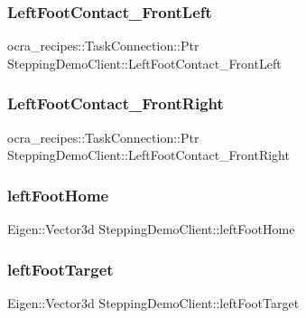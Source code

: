 \subsubsection{\texorpdfstring{Left\+Foot\+Contact\+\_\+\+Front\+Left}{LeftFootContact\_FrontLeft}}
{\footnotesize\ttfamily ocra\+\_\+recipes\+::\+Task\+Connection\+::\+Ptr Stepping\+Demo\+Client\+::\+Left\+Foot\+Contact\+\_\+\+Front\+Left\hspace{0.3cm}{\ttfamily [private]}}

\hypertarget{classSteppingDemoClient_ae2c0ca1ba0ef69b5f09fd3cd982fb772}{}\label{classSteppingDemoClient_ae2c0ca1ba0ef69b5f09fd3cd982fb772} 
\subsubsection{\texorpdfstring{Left\+Foot\+Contact\+\_\+\+Front\+Right}{LeftFootContact\_FrontRight}}
{\footnotesize\ttfamily ocra\+\_\+recipes\+::\+Task\+Connection\+::\+Ptr Stepping\+Demo\+Client\+::\+Left\+Foot\+Contact\+\_\+\+Front\+Right\hspace{0.3cm}{\ttfamily [private]}}

\hypertarget{classSteppingDemoClient_acd4cb9dbe053979701574f5d1d4ef349}{}\label{classSteppingDemoClient_acd4cb9dbe053979701574f5d1d4ef349} 
\subsubsection{\texorpdfstring{left\+Foot\+Home}{leftFootHome}}
{\footnotesize\ttfamily Eigen\+::\+Vector3d Stepping\+Demo\+Client\+::left\+Foot\+Home\hspace{0.3cm}{\ttfamily [private]}}

\hypertarget{classSteppingDemoClient_a2360933e2902d1b1a374787bd67e14e7}{}\label{classSteppingDemoClient_a2360933e2902d1b1a374787bd67e14e7} 
\subsubsection{\texorpdfstring{left\+Foot\+Target}{leftFootTarget}}
{\footnotesize\ttfamily Eigen\+::\+Vector3d Stepping\+Demo\+Client\+::left\+Foot\+Target\hspace{0.3cm}{\ttfamily [private]}}

